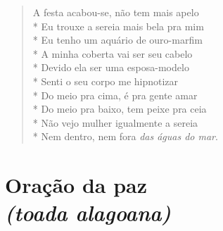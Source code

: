 \begin{verse}
A festa acabou-se, não tem mais apelo\\*
Eu trouxe a sereia mais bela pra mim\\*
Eu tenho um aquário de ouro-marfim\\*
A minha coberta vai ser seu cabelo\\*
Devido ela ser uma esposa-modelo\\*
Senti o seu corpo me hipnotizar\\*
Do meio pra cima, é pra gente amar\\*
Do meio pra baixo, tem peixe pra ceia\\*
Não vejo mulher igualmente a sereia\\*
Nem dentro, nem fora \textit{das águas do mar}.
\end{verse}


\chapter[Oração da paz]{Oração da paz\\\smallskip\textit{(toada alagoana)}}

